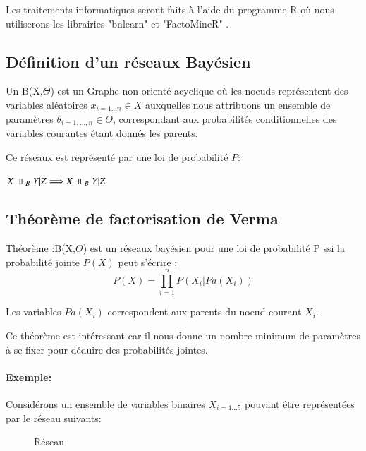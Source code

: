 \documentclass[a4paper]{article}
\begin{document}
Les traitements informatiques seront faits à l'aide du programme R où nous utiliserons les librairies "bnlearn" et "FactoMineR" .
  
\newpage


\subsection{Définition d'un réseaux Bayésien}

Un  B(X,$\Theta$)  est un Graphe non-orienté acyclique  où les noeuds représentent des variables aléatoires $x_{i=1...n} \in X$
auxquelles nous attribuons  un ensemble de paramètres $\theta_{i=1,...,n} \in \Theta$,
correspondant aux probabilités conditionnelles des variables courantes étant donnés les parents.

Ce réseaux est représenté par  une loi de probabilité  $P$:

\begin{center}
$X\perp\!\!\!\perp_{B}Y|Z\Longrightarrow X\perp\!\!\!\perp_{B}Y|Z$
\end{center}


\subsection{Théorème de factorisation de Verma}

\begin{theorem}{Théorème}
:B(X,$\Theta$) est un réseaux bayésien pour une loi de probabilité P ssi la probabilité jointe $P(X)$ peut s'écrire :
$$P(X)=\prod_{i=1}^n P(X_i|Pa(X_i))$$
\label{factoverma}
\end{theorem}

Les variables $Pa(X_{i})$ correspondent aux parents du noeud courant $X_{i}$.

Ce théorème est intéressant car il nous donne un nombre  minimum de  paramètres à se fixer   pour déduire des probabilités jointes.
\paragraph{Exemple:}

Considérons un ensemble de variables binaires ${X_{i=1...5}}$ pouvant  être représentées par le réseau suivants:
\begin{figure}[!ht] 
    \center 
    \caption{Réseau} 
\end{figure} 
 
\end{document}
